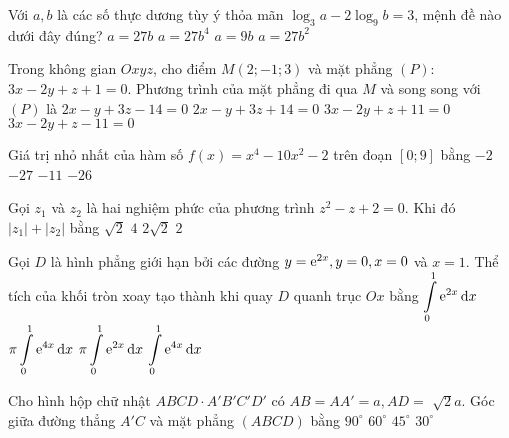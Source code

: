 \begin{ex}%
Với $a, b$ là các số thực dương tùy ý thỏa mãn $\log_3 a-2\log_9 b=3$, mệnh đề nào dưới đây đúng?
\choice
{\True $a=27 b$}
{$a=27 b^4$}
{$a=9 b$}
{$a=27 b^2$}

\end{ex}
\begin{ex}%
Trong không gian $O x y z$, cho điểm $M(2;-1; 3)$ và mặt phẳng $(P)$: $3 x-2 y+z+1=0$. Phương trình của mặt phẳng đi qua $M$ và song song với $(P)$ là
\choice
{\True $2 x-y+3 z-14=0$}
{$2 x-y+3 z+14=0$}
{$3 x-2 y+z+11=0$}
{$3 x-2 y+z-11=0$}

\end{ex}
\begin{ex}%
Giá trị nhỏ nhất của hàm số $f(x)=x^4-10 x^2-2$ trên đoạn $[0; 9]$ bằng
\choice
{$-2$}
{\True $-27$}
{$-11$}
{$-26$}

\end{ex}
\begin{ex}%
Gọi $z_1$ và $z_2$ là hai nghiệm phức của phương trình $z^2-z+2=0$. Khi đó $\left|z_1\right|+\left|z_2\right|$ bằng
\choice
{$\sqrt{2}$}
{$4$}
{\True $2\sqrt{2}$}
{$2$}

\end{ex}
\begin{ex}%
Gọi $D$ là hình phẳng giới hạn bởi các đường $y={\rm e}^{2 x}, y=0, x=0$ và $x=1$. Thể tích của khối tròn xoay tạo thành khi quay $D$ quanh trục $O x$ bằng
\choice
{$\displaystyle\displaystyle\int\limits_0^1 {\rm e}^{2 x} \mathrm{\,d} x$}
{\True $\pi \displaystyle\displaystyle\int\limits_0^1 {\rm e}^{4 x} \mathrm{\,d} x$}
{$\pi \displaystyle\displaystyle\int\limits_0^1 {\rm e}^{2 x} \mathrm{\,d} x$}
{$\displaystyle\displaystyle\int\limits_0^1 {\rm e}^{4 x} \mathrm{\,d} x$}

\end{ex}
\begin{ex}%
Cho hình hộp chữ nhật $ABCD \cdot A'B'C'D'$ có $AB=AA'=a, AD=$ $\sqrt{2} a$. Góc giữa đường thẳng $A'C$ và mặt phẳng $(ABCD)$ bằng
\choice
{$90^{\circ}$}
{$60^{\circ}$}
{$45^{\circ}$}
{\True $30^{\circ}$}

\end{ex}

